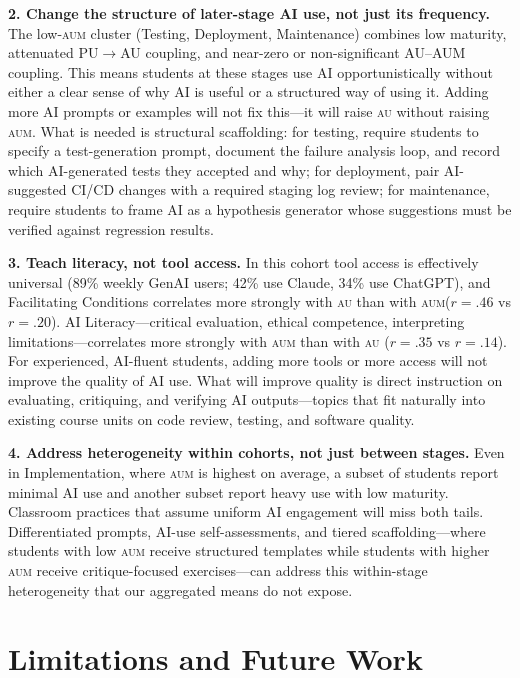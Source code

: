 \documentclass[sigconf,anonymous]{acmart}
\newcommand{\AUM}{\textsc{aum}\xspace}
\newcommand{\AU}{\textsc{au}\xspace}
\newcommand{\GenAI}{GenAI\xspace}
\begin{document}
\textbf{2. Change the structure of later-stage AI use, not just its
frequency.} The low-\AUM cluster (Testing, Deployment, Maintenance)
combines low maturity, attenuated PU$\rightarrow$AU coupling, and
near-zero or non-significant AU--AUM coupling. This means students at
these stages use AI opportunistically without either a clear sense of
why AI is useful or a structured way of using it. Adding more AI
prompts or examples will not fix this---it will raise \AU without
raising \AUM. What is needed is structural scaffolding: for testing,
require students to specify a test-generation prompt, document the
failure analysis loop, and record which AI-generated tests they
accepted and why; for deployment, pair AI-suggested CI/CD changes with
a required staging log review; for maintenance, require students to
frame AI as a hypothesis generator whose suggestions must be verified
against regression results.

\textbf{3. Teach literacy, not tool access.} In this cohort tool
access is effectively universal (89\% weekly \GenAI users; 42\% use
Claude, 34\% use ChatGPT), and Facilitating Conditions correlates more
strongly with \AU than with \AUM ($r = .46$ vs $r = .20$). AI
Literacy---critical evaluation, ethical competence, interpreting
limitations---correlates more strongly with \AUM than with \AU
($r = .35$ vs $r = .14$). For experienced, AI-fluent students, adding
more tools or more access will not improve the quality of AI use. What
will improve quality is direct instruction on evaluating, critiquing,
and verifying AI outputs---topics that fit naturally into existing
course units on code review, testing, and software quality.

\textbf{4. Address heterogeneity within cohorts, not just between
stages.} Even in Implementation, where \AUM is highest on average, a
subset of students report minimal AI use and another subset report
heavy use with low maturity. Classroom practices that assume uniform
AI engagement will miss both tails. Differentiated prompts, AI-use
self-assessments, and tiered scaffolding---where students with low
\AUM receive structured templates while students with higher \AUM
receive critique-focused exercises---can address this within-stage
heterogeneity that our aggregated means do not expose.

\section{Limitations and Future Work}
\label{sec:limitations}
\end{document}
